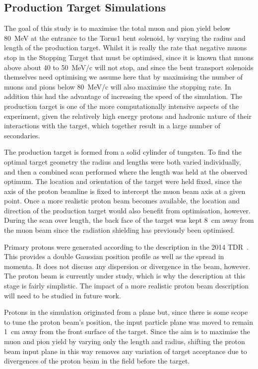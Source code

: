 \subsection{Production Target Simulations} 
The goal of this study is to maximise the total muon and pion
yield below 80~MeV at the entrance to the Torus1 bent solenoid, by varying the
radius and length of the production target.
Whilst it is really the rate that negative muons stop in the Stopping Target that must be optimised, 
since it is known that muons above about 40 to 50~MeV/c will not stop, and since the bent transport solenoids themselves need optimising
we assume here that by maximising the number of muons and pions below 80~MeV/c will also maximise the stopping rate.
In addition this had the advantage of increasing the speed of the simulation.
The production target is one of the more computationally intensive aspects
of the experiment, given the relatively high energy protons and hadronic nature of their interactions with the target, which together result in a large number of secondaries.

The production target is formed from a solid cylinder of tungsten.
To find the optimal target geometry the radius and lengths were both varied individually, and then a combined scan performed where the length was held at the observed optimum. 
The location and orientation of the target were held fixed, since the axis of the proton beamline is fixed to intercept the muon beam axis
at a given point.  Once a more realistic proton beam becomes available, the location and direction of the production target
would also benefit from optimisation, however.  During the scan over
length, the back face of the target was kept 8~cm away from the muon beam since
the radiation shielding has previously been optimised.

Primary protons were generated according to the description in the 2014 \phaseI TDR~\cite{TDR2014}.
This provides a double Gaussian position profile as well as the spread in momenta.
It does not discuss any dispersion or divergence in the beam, however.
The proton beam is currently under study, which is why the description at this stage is fairly simplistic.
The impact of a more realistic proton beam description will need to be studied in future work.

Protons in the simulation originated from a plane but, since there is some scope to tune the proton
beam's position, the input particle plane was moved to remain 1~cm away from
the front surface of the target.  Since the aim is to maximise the muon and
pion yield by varying only the length and radius, shifting the proton beam
input plane in this way removes any variation of target acceptance due to
divergences of the proton beam in the field before the target.

